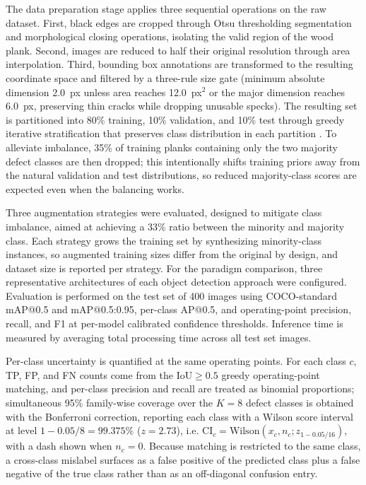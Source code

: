 \documentclass[pdflatex,sn-basic,Numbered,iicol]{sn-jnl}
\begin{document}
The data preparation stage applies three sequential operations on the raw dataset. First, black edges are cropped through Otsu thresholding segmentation \citep{otsu1979threshold} and morphological closing operations, isolating the valid region of the wood plank. Second, images are reduced to half their original resolution through area interpolation. Third, bounding box annotations are transformed to the resulting coordinate space and filtered by a three-rule size gate (minimum absolute dimension 2.0~px unless area reaches 12.0~px$^2$ or the major dimension reaches 6.0~px, preserving thin cracks while dropping unusable specks). The resulting set is partitioned into 80\% training, 10\% validation, and 10\% test through greedy iterative stratification that preserves class distribution in each partition \citep{kubat2000addressing}. To alleviate imbalance, 35\% of training planks containing only the two majority defect classes are then dropped; this intentionally shifts training priors away from the natural validation and test distributions, so reduced majority-class scores are expected even when the balancing works.

Three augmentation strategies were evaluated, designed to mitigate class imbalance, aimed at achieving a 33\% ratio between the minority and majority class. Each strategy grows the training set by synthesizing minority-class instances, so augmented training sizes differ from the original by design, and dataset size is reported per strategy. For the paradigm comparison, three representative architectures of each object detection approach were configured. Evaluation is performed on the test set of 400 images using COCO-standard mAP@0.5 and mAP@0.5:0.95, per-class AP@0.5, and operating-point precision, recall, and F1 at per-model calibrated confidence thresholds. Inference time is measured by averaging total processing time across all test set images.

Per-class uncertainty is quantified at the same operating points. For each class $c$, TP, FP, and FN counts come from the $\text{IoU}\ge 0.5$ greedy operating-point matching, and per-class precision and recall are treated as binomial proportions; simultaneous 95\% family-wise coverage over the $K = 8$ defect classes is obtained with the Bonferroni correction, reporting each class with a Wilson score interval at level $1 - 0.05/8 = 99.375\%$ ($z = 2.73$), i.e. $\mathrm{CI}_c = \mathrm{Wilson}(x_c, n_c; z_{1-0.05/16})$, with a dash shown when $n_c = 0$. Because matching is restricted to the same class, a cross-class mislabel surfaces as a false positive of the predicted class plus a false negative of the true class rather than as an off-diagonal confusion entry.
\end{document}
